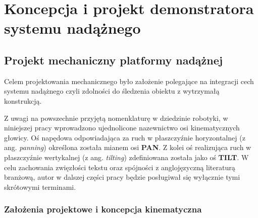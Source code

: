 \documentclass[a4paper,twoside,12pt]{book}
\newtheorem{Definition}{Definicja}
\newtheorem{Example}{Przykład}
\newtheorem{Theorem}{Twierdzenie}
\begin{document}
%
%




\chapter{Koncepcja i projekt demonstratora systemu nadążnego} 

\section{Projekt mechaniczny platformy nadążnej}

Celem projektowania mechanicznego było założenie polegające na integracji cech systemu nadążnego czyli zdolności do śledzenia obiektu z wytrzymałą konstrukcją.

Z uwagi na powszechnie przyjętą nomenklaturę w dziedzinie robotyki, w niniejszej pracy wprowadzono ujednolicone nazewnictwo osi kinematycznych głowicy. Oś napędowa odpowiadająca za ruch w płaszczyźnie horyzontalnej (z ang. \textit{panning}) określona została mianem osi \textbf{PAN}. Z kolei oś realizująca ruch w płaszczyźnie wertykalnej (z ang. \textit{tilting}) zdefiniowana została jako oś \textbf{TILT}. W celu zachowania zwięzłości tekstu oraz spójności z anglojęzyczną literaturą branżową, autor w dalszej części pracy będzie posługiwał się wyłącznie tymi skrótowymi terminami.

\subsection{Założenia projektowe i koncepcja kinematyczna}
\end{document}
